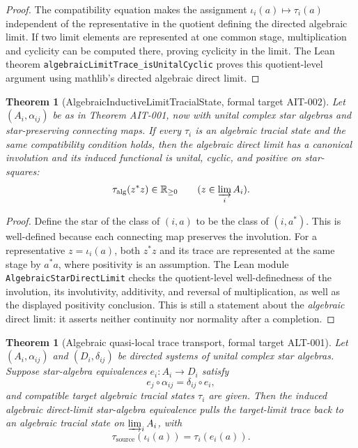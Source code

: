 \documentclass{article}
\newtheorem{theorem}[definition]{Theorem}
\begin{document}
\begin{proof}
The compatibility equation makes the assignment
\(\iota_i(a)\mapsto\tau_i(a)\) independent of the representative in the
quotient defining the directed algebraic limit.  If two limit elements are
represented at one common stage, multiplication and cyclicity can be computed
there, proving cyclicity in the limit.  The Lean theorem
\texttt{algebraicLimitTrace\_isUnitalCyclic} proves this quotient-level
argument using mathlib's directed algebraic direct limit.
\end{proof}

\begin{theorem}[AlgebraicInductiveLimitTracialState, formal target AIT-002]
Let \((A_i,\alpha_{ij})\) be as in Theorem AIT-001, now with unital complex
star algebras and star-preserving connecting maps.  If every \(\tau_i\) is an
algebraic tracial state and the same compatibility condition holds, then the
algebraic direct limit has a canonical involution and its induced functional
is unital, cyclic, and positive on star-squares:
\begin{equation*}
  \tau_{\mathrm{alg}}(z^*z)\in\mathbb R_{\geq0}
  \qquad (z\in\varinjlim_i A_i).
\end{equation*}
\end{theorem}

\begin{proof}
Define the star of the class of \((i,a)\) to be the class of \((i,a^*)\).
This is well-defined because each connecting map preserves the involution.
For a representative \(z=\iota_i(a)\), both \(z^*z\) and its trace are
represented at the same stage by \(a^*a\), where positivity is an assumption.
The Lean module \texttt{AlgebraicStarDirectLimit} checks the quotient-level
well-definedness of the involution, its involutivity, additivity, and reversal
of multiplication, as well as the displayed positivity conclusion.  This is
still a statement about the \emph{algebraic} direct limit: it asserts neither
continuity nor normality after a completion.
\end{proof}

\begin{theorem}[Algebraic quasi-local trace transport, formal target ALT-001]
Let \((A_i,\alpha_{ij})\) and \((D_i,\delta_{ij})\) be directed systems of
unital complex star algebras.  Suppose star-algebra equivalences
\(e_i:A_i\to D_i\) satisfy
\begin{equation*}
  e_j\circ\alpha_{ij}=\delta_{ij}\circ e_i,
\end{equation*}
and compatible target algebraic tracial states \(\tau_i\) are given.  Then the
induced algebraic direct-limit star-algebra equivalence pulls the target-limit
trace back to an algebraic tracial state on \(\varinjlim_i A_i\), with
\begin{equation*}
  \tau_{\mathrm{source}}(\iota_i(a))=\tau_i(e_i(a)).
\end{equation*}
\end{theorem}
\end{document}

